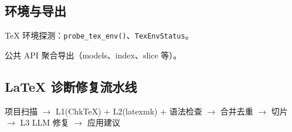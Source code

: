 \subsection{环境与导出}

\begin{description}[leftmargin=4em,style=nextline]
    \item[\texttt{tex\_env.py}]
    TeX 环境探测：\texttt{probe\_tex\_env()}、\texttt{TexEnvStatus}。

    \item[\texttt{\_\_init\_\_.py}]
    公共 API 聚合导出（models、index、slice 等）。
\end{description}

\subsection{LaTeX 诊断修复流水线}

\begin{center}
项目扫描 $\rightarrow$ L1(ChkTeX) + L2(latexmk) + 语法检查 $\rightarrow$ 合并去重
$\rightarrow$ 切片 $\rightarrow$ L3 LLM 修复 $\rightarrow$ 应用建议
\end{center}
